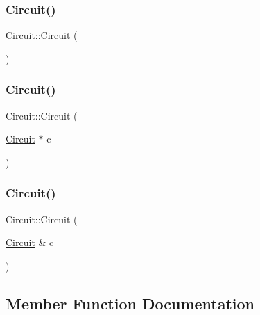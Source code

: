 \mbox{\label{class_circuit_a6a9c21735a28f1222797d71ece99521c}} 
\subsubsection{\texorpdfstring{Circuit()}{Circuit()}\hspace{0.1cm}{\footnotesize\ttfamily [1/3]}}
{\footnotesize\ttfamily Circuit\+::\+Circuit (\begin{DoxyParamCaption}{ }\end{DoxyParamCaption})}

\mbox{\label{class_circuit_aaf90541f622878c55fe6377e9d656684}} 
\subsubsection{\texorpdfstring{Circuit()}{Circuit()}\hspace{0.1cm}{\footnotesize\ttfamily [2/3]}}
{\footnotesize\ttfamily Circuit\+::\+Circuit (\begin{DoxyParamCaption}\item[{\hyperlink{class_circuit}{Circuit} $\ast$}]{c }\end{DoxyParamCaption})}

\mbox{\label{class_circuit_ae98bb5b64036d61c927cfbb2a1e82ad0}} 
\subsubsection{\texorpdfstring{Circuit()}{Circuit()}\hspace{0.1cm}{\footnotesize\ttfamily [3/3]}}
{\footnotesize\ttfamily Circuit\+::\+Circuit (\begin{DoxyParamCaption}\item[{\hyperlink{class_circuit}{Circuit} \&}]{c }\end{DoxyParamCaption})}



\subsection{Member Function Documentation}
\mbox{\label{class_circuit_ac8df627490e7b70cbdc547c2be4337d4}} 
